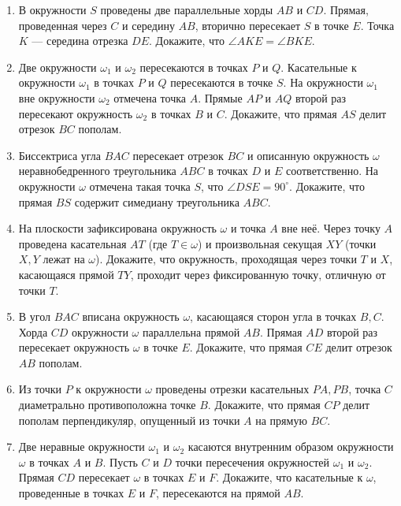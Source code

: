 \documentclass{article}
\begin{document}
\begin{enumerate}[label*=\protect\fbox{\arabic{enumi}}]
\item В окружности $S$ проведены две параллельные хорды $AB$ и $CD$. Прямая, проведенная через $C$ и середину $AB$, вторично пересекает $S$ в точке $E$. Точка $K$ — середина отрезка $DE$. Докажите, что $\angle AKE = \angle BKE.$

\item Две окружности $\omega_1$ и $\omega_2$ пересекаются в точках $P$ и $Q$. Касательные к окружности $\omega_1$ в точках $P$ и $Q$ пересекаются в точке $S$. На окружности $\omega_1$ вне окружности $\omega_2$
отмечена точка $A$. Прямые $AP$ и $AQ$ второй раз пересекают окружность $\omega_2$ в точках
$B$ и $C$. Докажите, что прямая $AS$ делит отрезок $BC$ пополам.

\item Биссектриса угла $BAC$ пересекает отрезок $BC$ и описанную окружность $\omega$ неравнобедренного треугольника $ABC$ в точках $D$ и $E$ соответственно. На окружности $\omega$ отмечена такая точка $S$, что $\angle DSE = 90^\circ$. Докажите, что прямая $BS$ содержит симедиану треугольника $ABC$.

\item На плоскости зафиксирована окружность $\omega$ и точка $A$ вне неё. Через точку $A$
проведена касательная $AT$ (где $T \in \omega$) и произвольная секущая $XY$ (точки $X, Y$
лежат на $\omega$). Докажите, что окружность, проходящая через точки $T$ и $X$, касающаяся прямой $TY$, проходит через фиксированную точку, отличную от точки $T$.

\item В угол $BAC$ вписана окружность $\omega$, касающаяся сторон угла в точках $B, C$. Хорда $CD$ окружности $\omega$ параллельна прямой $AB$. Прямая $AD$ второй раз пересекает окружность $\omega$ в точке $E$. Докажите, что прямая $CE$ делит отрезок $AB$ пополам.

\item Из точки $P$ к окружности $\omega$ проведены отрезки касательных $PA, PB$, точка $C$ диаметрально противоположна точке $B$. Докажите, что прямая $CP$ делит пополам перпендикуляр, опущенный из точки $A$ на прямую $BC$.

\item Две неравные окружности $\omega_1$ и $\omega_2$ касаются внутренним образом окружности $\omega$ в точках $A$ и $B$. Пусть $C$ и $D$ точки пересечения окружностей $\omega_1$ и $\omega_2$. Прямая $CD$ пересекает $\omega$ в точках $E$ и $F$.
Докажите, что касательные к $\omega$, проведенные в точках $E$ и $F$, пересекаются на прямой $AB$.


\end{enumerate}
\end{document}
